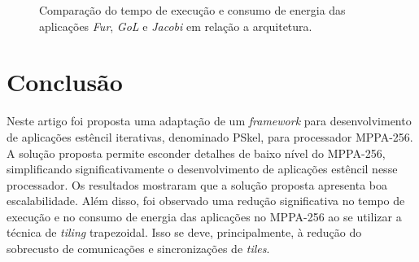 \documentclass[12pt]{article}
\newcommand{\pskel}{PSkel\xspace}
\newcommand{\mppa}{MPPA-256\xspace}
\begin{document}
\begin{figure}[t]
	\centering
    \qquad
	\caption{Comparação do tempo de execução e consumo de energia das aplicações \textit{Fur}, \textit{GoL} e \textit{Jacobi} em relação a arquitetura.}
	\label{fig:comparison-time}
\end{figure}

\section{Conclusão}
\label{sec:conclusao}

Neste artigo foi proposta uma adaptação de um \textit{framework} para
desenvolvimento de aplicações estêncil iterativas, denominado \pskel, para
processador \mppa. A solução proposta permite esconder detalhes de baixo nível
do \mppa, simplificando significativamente o desenvolvimento de aplicações
estêncil nesse processador. Os resultados mostraram que a solução proposta
apresenta boa escalabilidade. Além disso, foi observado uma redução
significativa no tempo de execução e no consumo de energia das aplicações no
\mppa ao se utilizar a técnica de \textit{tiling} trapezoidal. Isso se deve,
principalmente, à redução do sobrecusto de comunicações e sincronizações de
\textit{tiles}.
\end{document}
